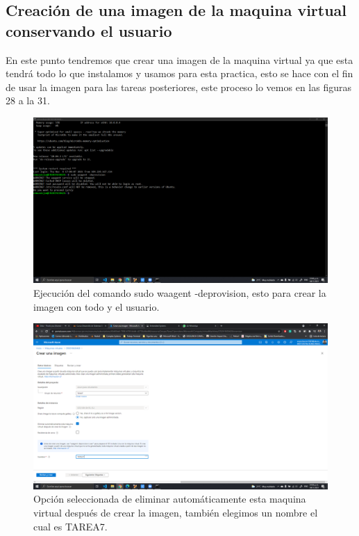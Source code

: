 \documentclass[11pt]{article}
\begin{document}
		\subsection{Creación de una imagen de la maquina virtual conservando el usuario}
		En este punto tendremos que crear una imagen de la maquina virtual ya que esta tendrá todo lo que instalamos y usamos para esta practica, esto se hace con el fin de usar la imagen para las tareas posteriores, este proceso lo vemos en las figuras 28 a la 31.
		\begin{figure}[H]
			\centering
			\includegraphics[scale=0.34]{resources/waagent.png}
			\caption{Ejecución del comando sudo waagent -deprovision, esto para crear la imagen con todo y el usuario.}\label{fig:picture}
		\end{figure}
		\begin{figure}[H]
			\centering
			\includegraphics[scale=0.34]{resources/crearimagen.png}
			\caption{Opción seleccionada de eliminar automáticamente esta maquina virtual después de crear la imagen, también elegimos un nombre el cual es TAREA7.}\label{fig:picture}
		\end{figure}
\end{document}
